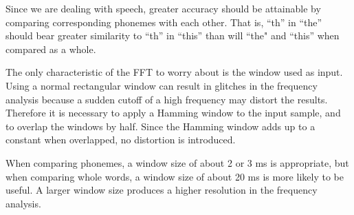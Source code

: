 Since we are dealing with speech, greater accuracy should be attainable by
comparing corresponding phonemes with each other.  That is, ``th'' in ``the''
should bear greater similarity to ``th'' in ``this'' than will ``the" and ``this'' when
compared as a whole.

The only characteristic of the FFT to worry about is the window used as input.
Using a normal rectangular window can result in glitches in the frequency
analysis because a sudden cutoff of a high frequency may distort the results.
Therefore it is necessary to apply a Hamming window to the input sample, and
to overlap the windows by half.  Since the Hamming window adds up to a constant
when overlapped, no distortion is introduced.

When comparing phonemes, a window size of about 2 or 3 ms is appropriate, but
when comparing whole words, a window size of about 20 ms is more likely to be
useful.  A larger window size produces a higher resolution in the frequency
analysis.
